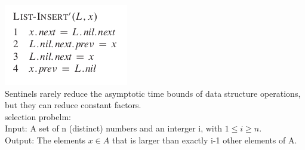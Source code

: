 \documentclass[11pt]{article}
\begin{document}
\includegraphics[width=.9\linewidth]{pics/c10_linked_list_insert_2.png} \\

Sentinels rarely reduce the asymptotic time bounds of data structure operations, but they can reduce constant factors. \\

selection probelm: \\
Input: A set of n (distinct) numbers and an interger i, with $1\le i\ge n$. \\
Output: The elements $x \in A$ that is larger than exactly i-1 other elements of A. \\
\end{document}
